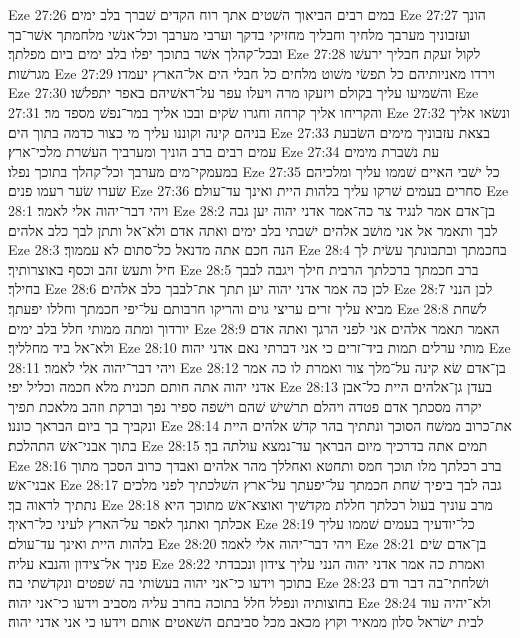 Eze 27:26  במים רבים הביאוך השׁטים אתך רוח הקדים שׁברך בלב ימים׃
Eze 27:27  הונך ועזבוניך מערבך מלחיך וחבליך מחזיקי בדקך וערבי מערבך וכל־אנשׁי מלחמתך אשׁר־בך ובכל־קהלך אשׁר בתוכך יפלו בלב ימים ביום מפלתך׃
Eze 27:28  לקול זעקת חבליך ירעשׁו מגרשׁות׃
Eze 27:29  וירדו מאניותיהם כל תפשׂי משׁוט מלחים כל חבלי הים אל־הארץ יעמדו׃
Eze 27:30  והשׁמיעו עליך בקולם ויזעקו מרה ויעלו עפר על־ראשׁיהם באפר יתפלשׁו׃
Eze 27:31  והקריחו אליך קרחה וחגרו שׂקים ובכו אליך במר־נפשׁ מספד מר׃
Eze 27:32  ונשׂאו אליך בניהם קינה וקוננו עליך מי כצור כדמה בתוך הים׃
Eze 27:33  בצאת עזבוניך מימים השׂבעת עמים רבים ברב הוניך ומערביך העשׁרת מלכי־ארץ׃
Eze 27:34  עת נשׁברת מימים במעמקי־מים מערבך וכל־קהלך בתוכך נפלו׃
Eze 27:35  כל ישׁבי האיים שׁממו עליך ומלכיהם שׂערו שׂער רעמו פנים׃
Eze 27:36  סחרים בעמים שׁרקו עליך בלהות היית ואינך עד־עולם׃
Eze 28:1  ויהי דבר־יהוה אלי לאמר׃
Eze 28:2  בן־אדם אמר לנגיד צר כה־אמר אדני יהוה יען גבה לבך ותאמר אל אני מושׁב אלהים ישׁבתי בלב ימים ואתה אדם ולא־אל ותתן לבך כלב אלהים׃
Eze 28:3  הנה חכם אתה מדנאל כל־סתום לא עממוך׃
Eze 28:4  בחכמתך ובתבונתך עשׂית לך חיל ותעשׂ זהב וכסף באוצרותיך׃
Eze 28:5  ברב חכמתך ברכלתך הרבית חילך ויגבה לבבך בחילך׃
Eze 28:6  לכן כה אמר אדני יהוה יען תתך את־לבבך כלב אלהים׃
Eze 28:7  לכן הנני מביא עליך זרים עריצי גוים והריקו חרבותם על־יפי חכמתך וחללו יפעתך׃
Eze 28:8  לשׁחת יורדוך ומתה ממותי חלל בלב ימים׃
Eze 28:9  האמר תאמר אלהים אני לפני הרגך ואתה אדם ולא־אל ביד מחלליך׃
Eze 28:10  מותי ערלים תמות ביד־זרים כי אני דברתי נאם אדני יהוה׃
Eze 28:11  ויהי דבר־יהוה אלי לאמר׃
Eze 28:12  בן־אדם שׂא קינה על־מלך צור ואמרת לו כה אמר אדני יהוה אתה חותם תכנית מלא חכמה וכליל יפי׃
Eze 28:13  בעדן גן־אלהים היית כל־אבן יקרה מסכתך אדם פטדה ויהלם תרשׁישׁ שׁהם וישׁפה ספיר נפך וברקת וזהב מלאכת תפיך ונקביך בך ביום הבראך כוננו׃
Eze 28:14  את־כרוב ממשׁח הסוכך ונתתיך בהר קדשׁ אלהים היית בתוך אבני־אשׁ התהלכת׃
Eze 28:15  תמים אתה בדרכיך מיום הבראך עד־נמצא עולתה בך׃
Eze 28:16  ברב רכלתך מלו תוכך חמס ותחטא ואחללך מהר אלהים ואבדך כרוב הסכך מתוך אבני־אשׁ׃
Eze 28:17  גבה לבך ביפיך שׁחת חכמתך על־יפעתך על־ארץ השׁלכתיך לפני מלכים נתתיך לראוה בך׃
Eze 28:18  מרב עוניך בעול רכלתך חללת מקדשׁיך ואוצא־אשׁ מתוכך היא אכלתך ואתנך לאפר על־הארץ לעיני כל־ראיך׃
Eze 28:19  כל־יודעיך בעמים שׁממו עליך בלהות היית ואינך עד־עולם׃
Eze 28:20  ויהי דבר־יהוה אלי לאמר׃
Eze 28:21  בן־אדם שׂים פניך אל־צידון והנבא עליה׃
Eze 28:22  ואמרת כה אמר אדני יהוה הנני עליך צידון ונכבדתי בתוכך וידעו כי־אני יהוה בעשׂותי בה שׁפטים ונקדשׁתי בה׃
Eze 28:23  ושׁלחתי־בה דבר ודם בחוצותיה ונפלל חלל בתוכה בחרב עליה מסביב וידעו כי־אני יהוה׃
Eze 28:24  ולא־יהיה עוד לבית ישׂראל סלון ממאיר וקוץ מכאב מכל סביבתם השׁאטים אותם וידעו כי אני אדני יהוה׃

